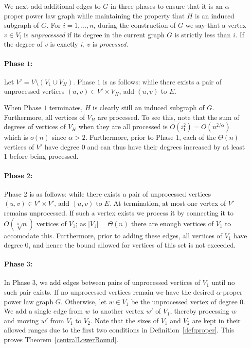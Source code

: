 \documentclass{article}
\theoremstyle{remark}
\begin{document}
We next add additional edges to $G$ in three phases to ensure that it is an $\alpha$-proper power law graph while maintaining the property that $H$ is an induced subgraph of $G$. For $i = 1,\ldots,n$, during the construction of $G$ we say that a vertex $v\in V_i$ is \emph{unprocessed} if its degree in the current graph $G$ is strictly less than $i$. If the degree of $v$ is exactly $i$, $v$ is \emph{processed}.

\paragraph{Phase $1$:}
Let $V' = V\setminus (V_1\cup V_H)$. Phase $1$ is as follows: while there exists a pair of unprocessed vertices $(u,v)\in V'\times V_H$, add $(u,v)$ to $E$.

When Phase $1$ terminates, $H$ is clearly still an induced subgraph of $G$. Furthermore, all vertices of $V_H$ are processed. To see this, note that the sum of degrees of vertices of $V_H$ when they are all processed is $O(i_1^2) = O(n^{2/\alpha})$ which is $o(n)$ since $\alpha > 2$. Furthermore, prior to Phase $1$, each of the $\Theta(n)$ vertices of $V'$ have degree $0$ and can thus have their degrees increased by at least $1$ before being processed.

\paragraph{Phase $2$:}
Phase $2$ is as follows: while there exists a pair of unprocessed vertices $(u,v)\in V'\times V'$, add $(u,v)$ to $E$. At termination, at most one vertex of $V'$ remains unprocessed. If such a vertex exists we process it by connecting it to $O(\sqrt[\alpha]n)$ vertices of $V_1$; as $\vert V_1\vert = \Theta(n)$ there are enough vertices of $V_1$ to accomodate this. Furthermore, prior to adding these edges, all vertices of $V_1$ have degree $0$, and hence the bound allowed for vertices of this set is not exceeded.

\paragraph{Phase $3$:}
In Phase $3$, we add edges between pairs of unprocessed vertices of $V_1$ until no such pair exists. If no unprocessed vertices remain we have the desired $\alpha$-proper power law graph $G$. Otherwise, let $w\in V_1$ be the unprocessed vertex of degree $0$. We add a single edge from $w$ to another vertex $w'$ of $V_1$, thereby processing $w$ and moving $w'$ from $V_1$ to $V_2$. Note that the sizes of $V_1$ and $V_2$ are kept in their allowed ranges due to the first two conditions in Definition~\ref{def:proper}. This proves Theorem~\ref{centralLowerBound}.
\end{document}

